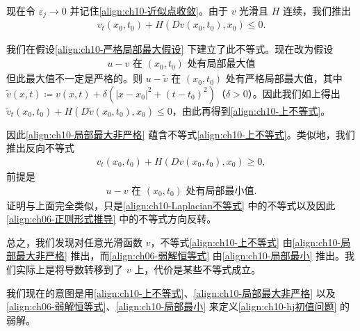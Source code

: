 \documentclass[../../main.tex]{subfiles}
\begin{document}
现在令 $\varepsilon_j\to 0$ 并记住\eqref{align:ch10-近似点收敛}。由于 $v$ 光滑且 $H$ 连续，我们推出
\begin{align}
v_t(x_0,t_0) + H(Dv(x_0,t_0), x_0) \leqslant 0.
\label{align:ch10-上不等式}
\end{align}

我们在假设\eqref{align:ch10-严格局部最大假设} 下建立了此不等式。现在改为假设
\begin{align}
u-v \text{ 在 } (x_0,t_0) \text{ 处有局部最大值}
\label{align:ch10-局部最大非严格}
\end{align}
但此最大值不一定是严格的。则 $u-\widetilde{v}$ 在 $(x_0,t_0)$ 处有严格局部最大值，其中 $\widetilde{v}(x,t)\coloneqq v(x,t)+\delta(|x-x_0|^2+(t-t_0)^2)$（$\delta>0$）。因此我们如上得出 $\widetilde{v}_t(x_0,t_0)+H(D\widetilde{v}(x_0,t_0),x_0)\leqslant 0$，由此再得到\eqref{align:ch10-上不等式}。

因此\eqref{align:ch10-局部最大非严格} 蕴含不等式\eqref{align:ch10-上不等式}。类似地，我们推出反向不等式
\begin{align}
v_t(x_0,t_0) + H(Dv(x_0,t_0), x_0) \geqslant 0,
\label{align:ch06-弱解恒等式}
\end{align}
前提是
\begin{align}
u-v \text{ 在 } (x_0,t_0) \text{ 处有局部最小值}.
\label{align:ch10-局部最小}
\end{align}
证明与上面完全类似，只是\eqref{align:ch10-Laplacian不等式} 中的不等式以及因此\eqref{align:ch06-正则形式推导} 中的不等式方向反转。

总之，我们发现对任意光滑函数 $v$，不等式\eqref{align:ch10-上不等式} 由\eqref{align:ch10-局部最大非严格} 推出，而\eqref{align:ch06-弱解恒等式} 由\eqref{align:ch10-局部最小} 推出。我们实际上是将导数转移到了 $v$ 上，代价是某些不等式成立。

我们现在的意图是用\eqref{align:ch10-上不等式}、\eqref{align:ch10-局部最大非严格} 以及\eqref{align:ch06-弱解恒等式}、\eqref{align:ch10-局部最小} 来定义\eqref{align:ch10-hj初值问题} 的弱解。
\end{document}
